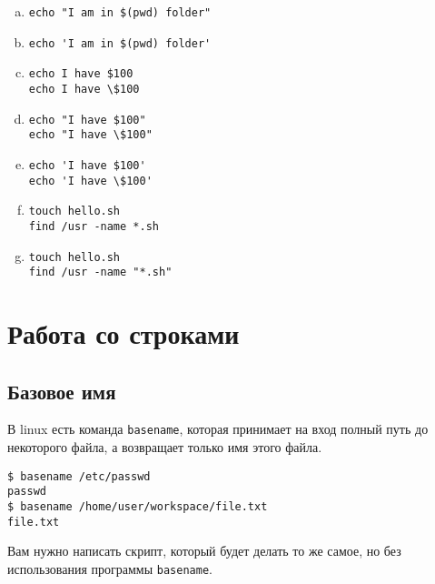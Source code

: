 \documentclass{article}
\begin{document}
\begin{multicols}{2}
\begin{enumerate}[(a)]
\item \begin{verbatim}
echo "I am in $(pwd) folder"
\end{verbatim}

\item \begin{verbatim}
echo 'I am in $(pwd) folder'
\end{verbatim}

\item \begin{verbatim}
echo I have $100
echo I have \$100
\end{verbatim}

\item \begin{verbatim}
echo "I have $100"
echo "I have \$100"
\end{verbatim}

\item \begin{verbatim}
echo 'I have $100'
echo 'I have \$100'
\end{verbatim}

\item \begin{verbatim}
touch hello.sh
find /usr -name *.sh
\end{verbatim}

\item \begin{verbatim}
touch hello.sh
find /usr -name "*.sh"
\end{verbatim}

\end{enumerate}
\end{multicols}



\section{Работа со строками}
\subsection{Базовое имя}
В linux есть команда \texttt{basename}, которая принимает на вход полный путь до некоторого файла, а возвращает только имя этого файла.
\begin{lstlisting}
$ basename /etc/passwd
passwd
$ basename /home/user/workspace/file.txt
file.txt
\end{lstlisting}
Вам нужно написать скрипт, который будет делать то же самое, но без использования программы \texttt{basename}.
\end{document}
